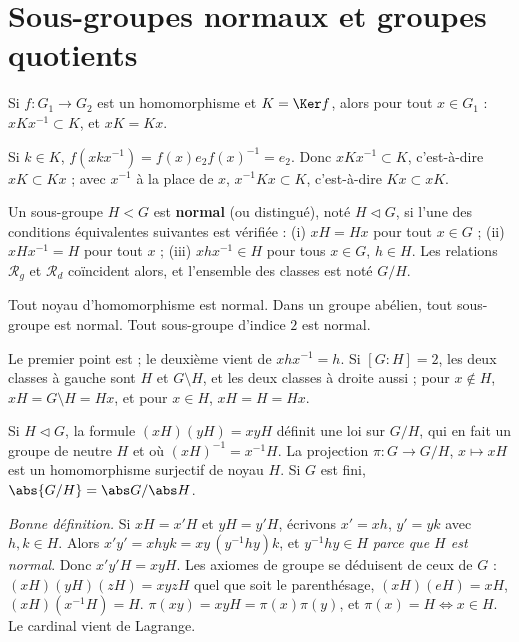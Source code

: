 \section{Sous-groupes normaux et groupes quotients}
\begin{proposition}\label{prop-noyau-normal}
Si $f:G_1\to G_2$ est un homomorphisme et $K=\Ker f$, alors pour tout $x\in G_1$ : $xKx^{-1}\subset K$, et $xK=Kx$.
\end{proposition}
\begin{preuve}
Si $k\in K$, $f(xkx^{-1})=f(x)e_2f(x)^{-1}=e_2$. Donc $xKx^{-1}\subset K$, c'est-à-dire $xK\subset Kx$ ; avec $x^{-1}$ à la place de $x$, $x^{-1}Kx\subset K$, c'est-à-dire $Kx\subset xK$.
\end{preuve}
\begin{definition}
Un sous-groupe $H<G$ est \textbf{normal} (ou distingué), noté $H\lhd G$, si l'une des conditions équivalentes suivantes est vérifiée : (i) $xH=Hx$ pour tout $x\in G$ ; (ii) $xHx^{-1}=H$ pour tout $x$ ; (iii) $xhx^{-1}\in H$ pour tous $x\in G$, $h\in H$. Les relations $\mathcal R_g$ et $\mathcal R_d$ coïncident alors, et l'ensemble des classes est noté $G/H$.
\end{definition}
\begin{proposition}\label{prop-normaux-usuels}
Tout noyau d'homomorphisme est normal. Dans un groupe abélien, tout sous-groupe est normal. Tout sous-groupe d'indice $2$ est normal.
\end{proposition}
\begin{preuve}
Le premier point est  ; le deuxième vient de $xhx^{-1}=h$. Si $[G:H]=2$, les deux classes à gauche sont $H$ et $G\setminus H$, et les deux classes à droite aussi ; pour $x\notin H$, $xH=G\setminus H=Hx$, et pour $x\in H$, $xH=H=Hx$.
\end{preuve}
\begin{theoreme}\label{thm-quotient}
Si $H\lhd G$, la formule $(xH)(yH)=xyH$ définit une loi sur $G/H$, qui en fait un groupe de neutre $H$ et où $(xH)^{-1}=x^{-1}H$. La projection $\pi:G\to G/H$, $x\mapsto xH$ est un homomorphisme surjectif de noyau $H$. Si $G$ est fini, $\abs{G/H}=\abs G/\abs H$.
\end{theoreme}
\begin{preuve}
\emph{Bonne définition.} Si $xH=x'H$ et $yH=y'H$, écrivons $x'=xh$, $y'=yk$ avec $h,k\in H$. Alors $x'y'=xhyk=xy\,(y^{-1}hy)k$, et $y^{-1}hy\in H$ \emph{parce que $H$ est normal}. Donc $x'y'H=xyH$. Les axiomes de groupe se déduisent de ceux de $G$ : $(xH)(yH)(zH)=xyzH$ quel que soit le parenthésage, $(xH)(eH)=xH$, $(xH)(x^{-1}H)=H$. $\pi(xy)=xyH=\pi(x)\pi(y)$, et $\pi(x)=H\iff x\in H$. Le cardinal vient de Lagrange.
\end{preuve}
